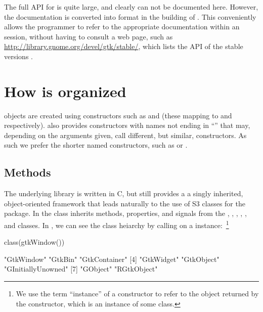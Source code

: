 The full API for \GTK\/ is quite large, and clearly can not be
documented here. However, the \GTK\/ documentation is converted into
\R\/ format in the building of . This conveniently allows
the programmer to refer to the appropriate documentation within an
\R\/ session, without having to consult  a web page, such as
\url{http://library.gnome.org/devel/gtk/stable/}, which lists the API
of the stable versions \GTK.




\section{How \GTK\/ is organized}
\label{sec:RGtk2:constructors}


\GTK\/ objects are created using constructors such as
 and  (these
mapping to  and
 respectively).  also
provides constructors with names not ending in ``'' that may,
depending on the arguments given, call different, but similar,
constructors. As such we prefer the shorter named constructors, such as
 or .

\subsection{Methods}


The underlying \GTK\/ library is written in C, but still provides a a
singly inherited, object-oriented framework that leads naturally to
the use of S3 classes for the \R\/ package. In \GTK\/ the
 class inherits methods, properties, and signals from
the , , ,
, , and 
classes. In , we can see the class heiarchy by calling
 on a  instance:~\footnote{We use
  the term ``instance'' of a constructor to refer to the object
  returned by the constructor, which is an instance of some class.}
\begin{Schunk}
\begin{Sinput}
 class(gtkWindow())
\end{Sinput}
\begin{Soutput}
[1] "GtkWindow"         "GtkBin"            "GtkContainer"     
[4] "GtkWidget"         "GtkObject"         "GInitiallyUnowned"
[7] "GObject"           "RGtkObject"       
\end{Soutput}
\end{Schunk}

